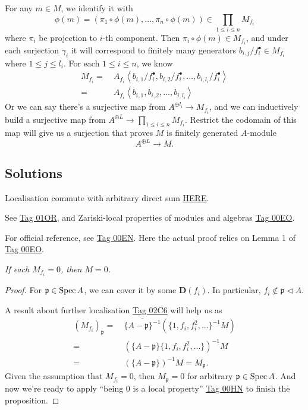 For any $m\in M$, we identify it with \[\phi(m)=(\pi_1\circ \phi(m),...,\pi_n\circ\phi(m))\in\prod_{1\leq i\leq n}M_{f_i}\] where $\pi_i$ be projection to $i$-th component. Then $\pi_i\circ \phi(m)\in M_{f_i}$, and under each surjection $\gamma_i$ it will correspond to finitely many generators $b_{i,j}/f^{\bullet}_{i}\in M_{f_i}$ where $1\leq j\leq l_i$. For each $1\leq i\leq n$, we know 
\begin{align*}
	M_{f_i}=&~ A_{f_i} \left\langle b_{i,1}/f^{\bullet}_{i}, b_{i,2}/f^{\bullet}_{i}, ..., b_{i,l_i}/f^{\bullet}_{i}\right\rangle\\
	=&~ A_{f_i} \left\langle b_{i,1}, b_{i,2}, ..., b_{i,l_i}\right\rangle
\end{align*}
Or we can say there's a surjective map from $A^{\oplus l_i}\to M_{f_i}$, and we can inductively build a surjective map from $A^{\oplus L}\to \prod_{1\leq i\leq n}M_{f_i}$. Restrict the codomain of this map will give us a surjection that proves $M$ is finitely generated $A$-module
\[A^{\oplus L}\to M.\]


\subsection{Solutions}

Localisation commute with arbitrary direct sum \href{https://math.stackexchange.com/questions/3386775/localization-commutes-with-arbitrary-direct-sums}{HERE}. 

See \href{https://stacks.math.columbia.edu/tag/01OR}{Tag 01OR}, and Zariski-local properties of modules and algebras \href{https://stacks.math.columbia.edu/tag/00EO}{Tag 00EO}.

For official reference, see \href{https://stacks.math.columbia.edu/tag/00EN}{Tag 00EN}. Here the actual proof relies on Lemma 1 of \href{https://stacks.math.columbia.edu/tag/00EO}{Tag 00EO}.

\textit{If each $M_{f_i}=0$, then $M=0$.}
\begin{proof}
	For $\mathfrak p\in \operatorname{Spec} A$, we can cover it by some $\mathbf D(f_i)$. In particular, $f_i\notin \mathfrak p\triangleleft A$.

	A result about further localisation \href{https://stacks.math.columbia.edu/tag/02C6}{Tag 02C6} will help us as
	\begin{align*}
		(M_{f_i})_{\mathfrak p} =&~ \overline{\{A-\mathfrak p\}^{-1}}(\{1,f_i,f_i^2,...\}^{-1}M)\\
		=&~ (\{A-\mathfrak p\}\{1,f_i,f_i^2,...\})^{-1}M\\
		=&~ (\{A-\mathfrak p\})^{-1}M=M_{\mathfrak p}.
	\end{align*}
	Given the assumption that $M_{f_i}=0$, then $M_{\mathfrak p}=0$ for arbitrary $\mathfrak p\in\operatorname{Spec} A$. And now we're ready to apply \enquote{being 0 is a local property} \href{https://stacks.math.columbia.edu/tag/00HN}{Tag 00HN} to finish the proposition. 

\end{proof}



